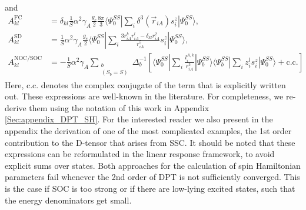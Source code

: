 and
\begin{align}
A_{kl}^\text{FC} &= \delta_{kl} \frac{1}{S} \alpha^2 \gamma_A \frac{g_e}{2} \frac{8\pi}{3} \langle \Psi_0^{SS}|\sum_i \delta^3(\vec r_{iA}) s_i^z  | \Psi_0^{SS}\rangle, \label{Eq:DPT_AFC}\\ 
A_{kl}^\text{SD} &=  \frac{1}{S} \alpha^2 \gamma_A \frac{g_e}{2} \langle \Psi_0^{SS}|\sum_i \frac{3 r_{iA}^k r_{iA}^l - \delta_{kl}r_{iA}^2}{r_{iA}^5} s_i^z | \Psi_0^{SS}\rangle, \label{Eq:DPT_ASD}\\ 
 A_{kl}^{\text{NOC/SOC}} &= - \frac{1}{S} \alpha^2 \gamma_A \sum_{\substack{b \\ (S_b = S)}} \Delta_b^{-1} \left[ \langle \Psi_0^{SS} | \sum_i \frac{l_i^{A,k}}{r_{iA}^3} | \Psi_b^{SS}\rangle \langle \Psi_b^{SS} | \sum_i z_i^l s_i^z | \Psi_0^{SS} \rangle + \text{c.c.}\right] \label{Eq:DPT_ANOC_SOC} 
\end{align}
Here, c.c. denotes the complex conjugate of the term that is explicitly written out.
These expressions are well-known in the literature.\cite{McWee_1992_}\cite{NeeseS_2003_345} For completeness, we re-derive them using the notation of this work in Appendix \ref{Sec:appendix_DPT_SH}.
For the interested reader we also present in the appendix the derivation of one of the most complicated examples, the 1st order contribution to the D-tensor that arises from SSC. It should be noted that these expressions can be reformulated in the linear response framework, to avoid explicit sums over states.\cite{Neese_2017_1} Both approaches for the calculation of spin Hamiltonian parameters fail whenever the 2nd order of DPT is not sufficiently converged. This is the case if SOC is too strong or if there are low-lying excited states, such that the energy denominators get small.

